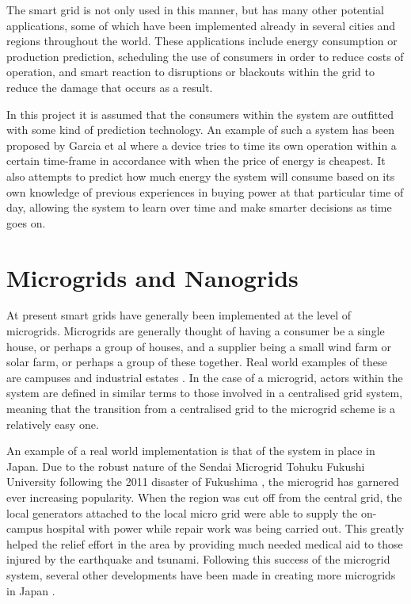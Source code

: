 \documentclass[a4paper, notitlepage]{report}
\begin{document}
The smart grid is not only used in this manner, but has many other potential
applications, some of which have been implemented already in several cities and
regions throughout the world. These applications include energy consumption or
production prediction, scheduling the use of consumers in order to reduce costs
of operation, and smart reaction to disruptions or blackouts within the grid to
reduce the damage that occurs as a result. 

In this project it is assumed that the consumers within the system are outfitted
with some kind of prediction technology. An example of such a system has been
proposed by Garcia et al \cite{mohsenian2010optimal} where a device tries to time
its own operation within a certain time-frame in accordance with when the price
of energy is cheapest. It also attempts to predict how much energy the system
will consume based on its own knowledge of previous experiences in buying power
at that particular time of day, allowing the system to learn over time and make
smarter decisions as time goes on. 
\section{Microgrids and Nanogrids}
\label{sec:org7074570}
At present smart grids have generally been implemented at the level of
microgrids. Microgrids are generally thought of having a consumer be a single
house, or perhaps a group of houses, and a supplier being a small wind farm or
solar farm, or perhaps a group of these together. Real world examples of these
are campuses and industrial estates \cite{markvart2006microgrids}. In the case of
a microgrid, actors within the system are defined in similar terms to those
involved in a centralised grid system, meaning that the transition from a
centralised grid to the microgrid scheme is a relatively easy one.

An example of a real world implementation is that of the system in place in
Japan. Due to the robust nature of the Sendai Microgrid Tohuku Fukushi
University following the 2011 disaster of Fukushima \cite{hirose2013sendai}, the
microgrid has garnered ever increasing popularity. When the region was cut off
from the central grid, the local generators attached to the local micro grid
were able to supply the on-campus hospital with power while repair work was
being carried out. This greatly helped the relief effort in the area by
providing much needed medical aid to those injured by the earthquake and
tsunami. Following this success of the microgrid system, several other
developments have been made in creating more microgrids in Japan
\cite{japan_microgrids}. 
\end{document}
